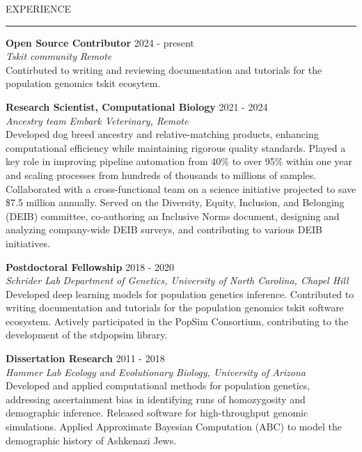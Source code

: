 \documentclass{resume} %
\renewenvironment{rSection}[1]{
\sectionskip
\textcolor{RoyalPurple}{\MakeUppercase{#1}}
\sectionlineskip
\hrule
\begin{list}{}{
\setlength{\leftmargin}{1.5em}
}
\item[]
}{
\end{list}
}
\begin{document}
\begin{rSection}{Experience}

{\bf Open Source Contributor} \hfill  2024 - present\\ 
{\em Tskit community} \hfill {\em Remote}\\
Contirbuted to writing and reviewing documentation and tutorials for the population genomics tskit ecosytem.

{\bf Research Scientist, Computational Biology} \hfill  2021 - 2024\\ 
{\em Ancestry team} \hfill {\em Embark Veterinary, Remote}\\
Developed dog breed ancestry and relative-matching products, enhancing computational efficiency while maintaining rigorous quality standards. Played a key role in improving pipeline automation from 40\% to over 95\% within one year and scaling processes from hundreds of thousands to millions of samples. Collaborated with a cross-functional team on a science initiative projected to save \$7.5 million annually. Served on the Diversity, Equity, Inclusion, and Belonging (DEIB) committee, co-authoring an Inclusive Norms document, designing and analyzing company-wide DEIB surveys, and contributing to various DEIB initiatives.

{\bf Postdoctoral Fellowship} \hfill  2018 - 2020\\ 
{\em Schrider Lab} \hfill {\em Department of Genetics, University of North Carolina, Chapel Hill}\\
Developed deep learning models for population genetics inference. Contributed to writing documentation and tutorials for the population genomics tskit software ecosystem. Actively participated in the PopSim Consortium, contributing to the development of the stdpopsim library.


{\bf Dissertation Research} \hfill  2011 - 2018\\ 
{\em Hammer Lab} \hfill {\em Ecology and Evolutionary Biology, University of Arizona}\\
Developed and applied computational methods for population genetics, addressing ascertainment bias in identifying runs of homozygosity and demographic inference. Released software for high-throughput genomic simulations. Applied Approximate Bayesian Computation (ABC) to model the demographic history of Ashkenazi Jews.

\end{rSection}


\end{document}
